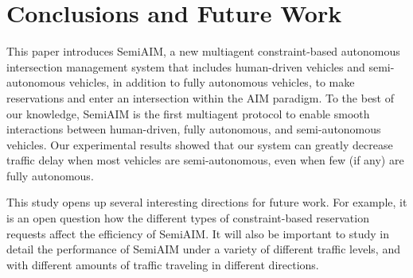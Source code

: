 \section{Conclusions and Future Work}

This paper introduces SemiAIM, a new multiagent constraint-based
autonomous intersection management system that includes human-driven
vehicles and semi-autonomous vehicles, in addition to fully autonomous
vehicles, to make reservations and enter an intersection within the
AIM paradigm.  To the best of our knowledge, SemiAIM is the first
multiagent protocol to enable smooth interactions between
human-driven, fully autonomous, and semi-autonomous vehicles.  Our
experimental results showed that our system can greatly decrease
traffic delay when most vehicles are semi-autonomous, even when few
(if any) are fully autonomous.

This study opens up several interesting directions for future work.
For example, it is an open question how the different types of
constraint-based reservation requests affect the efficiency of
SemiAIM.
  It will also be important to study in detail the performance
of SemiAIM under a variety of different traffic levels, and with
different amounts of traffic traveling in different directions.

